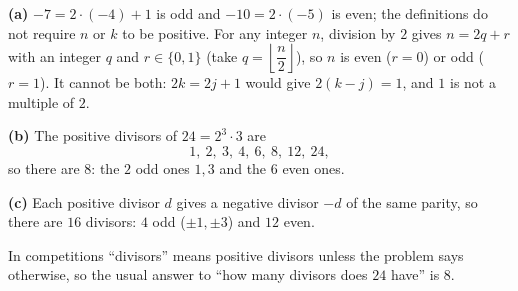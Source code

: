 \textbf{(a)} $-7=2\cdot(-4)+1$ is odd and $-10=2\cdot(-5)$ is even; the definitions do not require $n$ or $k$ to be positive. For any integer $n$, division by $2$ gives $n=2q+r$ with an integer $q$ and $r\in\{0,1\}$ (take $q=\left\lfloor\dfrac {n}{2}\right\rfloor$), so $n$ is even ($r=0$) or odd ($r=1$). It cannot be both: $2k=2j+1$ would give $2(k-j)=1$, and $1$ is not a multiple of $2$.

\textbf{(b)} The positive divisors of $24=2^3\cdot3$ are
\[1,\ 2,\ 3,\ 4,\ 6,\ 8,\ 12,\ 24,\]
so there are $\boxed{8}$: the $2$ odd ones $1,3$ and the $6$ even ones.

\textbf{(c)} Each positive divisor $d$ gives a negative divisor $-d$ of the same parity, so there are $\boxed{16}$ divisors: $4$ odd ($\pm1,\pm3$) and $12$ even.

In competitions ``divisors'' means positive divisors unless the problem says otherwise, so the usual answer to ``how many divisors does $24$ have'' is $8$.
